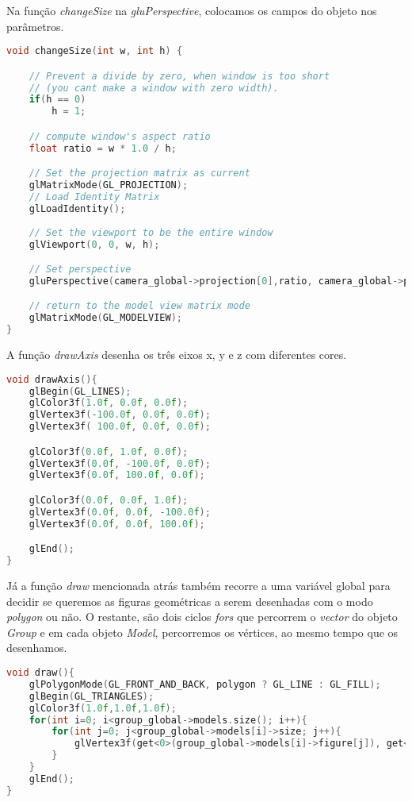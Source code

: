 \documentclass[14pt, a4 paper]{report}
\begin{document}
Na função \textit{changeSize} na \textit{gluPerspective}, colocamos os campos do objeto nos parâmetros. 
\begin{lstlisting}[language = c++]
void changeSize(int w, int h) {

	// Prevent a divide by zero, when window is too short
	// (you cant make a window with zero width).
	if(h == 0)
		h = 1;

	// compute window's aspect ratio 
	float ratio = w * 1.0 / h;

	// Set the projection matrix as current
	glMatrixMode(GL_PROJECTION);
	// Load Identity Matrix
	glLoadIdentity();
	
	// Set the viewport to be the entire window
    glViewport(0, 0, w, h);

	// Set perspective
	gluPerspective(camera_global->projection[0],ratio, camera_global->projection[1] ,camera_global->projection[2]);

	// return to the model view matrix mode
	glMatrixMode(GL_MODELVIEW);
}
\end{lstlisting}

A função \textit{drawAxis} desenha os três eixos x, y e z com diferentes cores.
\begin{lstlisting}[language = c++]
void drawAxis(){
	glBegin(GL_LINES);
	glColor3f(1.0f, 0.0f, 0.0f);
	glVertex3f(-100.0f, 0.0f, 0.0f);
	glVertex3f( 100.0f, 0.0f, 0.0f);

	glColor3f(0.0f, 1.0f, 0.0f);
	glVertex3f(0.0f, -100.0f, 0.0f);
	glVertex3f(0.0f, 100.0f, 0.0f);

	glColor3f(0.0f, 0.0f, 1.0f);
	glVertex3f(0.0f, 0.0f, -100.0f);
	glVertex3f(0.0f, 0.0f, 100.0f);

	glEnd();
}
\end{lstlisting}

Já a função \textit{draw} mencionada atrás também recorre a uma variável global para decidir se queremos as figuras geométricas a serem desenhadas com o modo \textit{polygon} ou não. O restante, são dois ciclos \textit{fors} que percorrem o \textit{vector} do objeto \textit{Group} e em cada objeto \textit{Model}, percorremos os vértices, ao mesmo tempo que os desenhamos.
\begin{lstlisting}[language = c++]
void draw(){
	glPolygonMode(GL_FRONT_AND_BACK, polygon ? GL_LINE : GL_FILL);
	glBegin(GL_TRIANGLES);
	glColor3f(1.0f,1.0f,1.0f);
	for(int i=0; i<group_global->models.size(); i++){
		for(int j=0; j<group_global->models[i]->size; j++){
			glVertex3f(get<0>(group_global->models[i]->figure[j]), get<1>(group_global->models[i]->figure[j]), get<2>(group_global->models[i]->figure[j]));
		}
	}
	glEnd();
}
\end{lstlisting}
\end{document}

